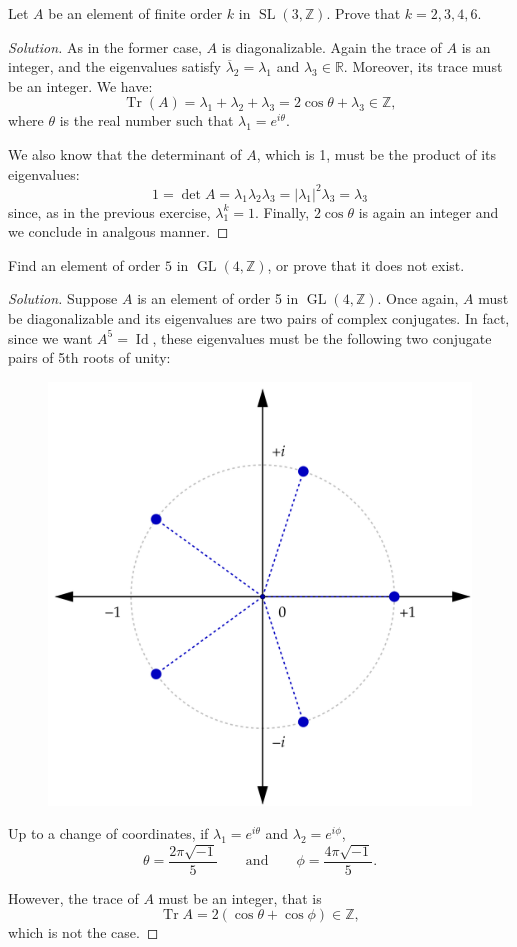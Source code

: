 \documentclass{article}
\newcommand{\R}{\mathbb{R}}
\newcommand{\Z}{\mathbb{Z}}
\DeclareMathOperator{\Id}{Id}
\DeclareMathOperator{\Tr}{Tr}
\DeclareMathOperator{\GL}{GL}
\DeclareMathOperator{\SL}{SL}
\begin{document}
\begin{exercise}
	Let $A$ be an element of finite order $k$ in $\SL(3,\Z)$. Prove that $k=2,3,4,6$.
\end{exercise}
\begin{proof}[Solution]
	As in the former case, $A$ is diagonalizable. Again the trace of $A$ is an integer, and the eigenvalues satisfy $\overline{\lambda}_2=\lambda_1$ and $\lambda_3\in\R$. Moreover, its trace must be an integer. We have: \[\Tr(A)=\lambda_1+\lambda_2+\lambda_3=2\cos\theta+\lambda_3\in\Z,\]
	where $\theta$ is the real number such that $\lambda_1=e^{i\theta}$.
	
	We also know that the determinant of $A$, which is 1, must be the product of its eigenvalues:
	\[1=\det A=\lambda_1\lambda_2\lambda_3=|\lambda_1|^2\lambda_3=\lambda_3\]
	since, as in the previous exercise, $\lambda_1^k=1$. Finally, $2\cos\theta$ is again an integer and we conclude in analgous manner.
	
\end{proof}
\clearpage
\begin{exercise}
	Find an element of order $5$ in $\GL(4,\Z)$, or prove that it does not exist.
\end{exercise}
\begin{proof}[Solution]
	Suppose $A$ is an element of order 5 in $\GL(4,\Z)$. Once again, $A$ must be diagonalizable and its eigenvalues are two pairs of complex conjugates. In fact, since we want $A^5=\Id$, these eigenvalues must be the following two conjugate pairs of 5th roots of unity: 
	\begin{figure}[H]
		\centering
		\includegraphics[width=0.5\linewidth]{../home-assignment5/5th-roots-of-unity}
		\label{fig:5th-roots-of-unity}
	\end{figure}	
	Up to a change of coordinates, if $\lambda_1=e^{i\theta}$ and $\lambda_2=e^{i\phi}$,
	\[\theta=\frac{2\pi\sqrt{-1}}{5}\qquad\text{and}\qquad\phi=\frac{4\pi\sqrt{-1}}{5}.\]
	
	However, the trace of $A$ must be an integer, that is
	\[\Tr A=2(\cos\theta+\cos\phi)\in\Z,\]
	which is not the case.
\end{proof}
\end{document}
